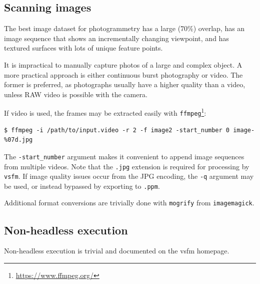 \subsection{Scanning images}
The best image dataset for photogrammetry has a large (70\%) overlap, has an image sequence that shows an incrementally changing viewpoint, and has textured surfaces with lots of unique feature points.

It is impractical to manually capture photos of a large and complex object. A more practical approach is either continuous burst photography or video. The former is preferred, as photographs usually have a higher quality than a video, unless RAW video is possible with the camera.

If video is used, the frames may be extracted easily with {\tt ffmpeg}\footnote{\url{https://www.ffmpeg.org/}}:

\begin{lstlisting}
$ ffmpeg -i /path/to/input.video -r 2 -f image2 -start_number 0 image-%07d.jpg
\end{lstlisting}

The {\tt -start\_number} argument makes it convenient to append image sequences from multiple videos. Note that the {\tt .jpg} extension is required for processing by {\tt vsfm}. If image quality issues occur from the JPG encoding, the {\tt -q} argument may be used, or instead bypassed by exporting to {\tt .ppm}.

Additional format conversions are trivially done with {\tt mogrify} from {\tt imagemagick}.

\subsection{Non-headless execution}

Non-headless execution is trivial and documented on the vsfm homepage.

